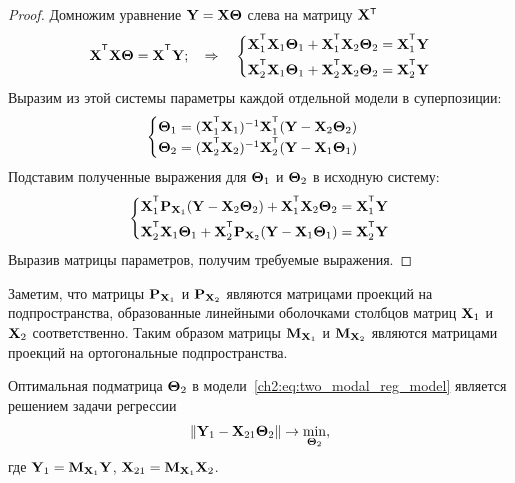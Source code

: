 \begin{proof}
	Домножим уравнение $\mathbf{Y} = \mathbf{X} \boldsymbol{\Theta}$ слева на матрицу $\bX{\T}$
	\[
		\bX^{\T} \bX \bTheta = \bX^{\T} \bY; \quad \Rightarrow \quad
		\begin{cases*}
			\bX_1^{\T} \bX_1 \bTheta_1 + \bX_1^{\T} \bX_2 \bTheta_2 = \bX_1^{\T} \bY \\
			\bX_2^{\T} \bX_1 \bTheta_1 + \bX_2^{\T} \bX_2 \bTheta_2 = \bX_2^{\T} \bY 
		\end{cases*}
	\]
	Выразим из этой системы параметры каждой отдельной модели в суперпозиции:
	\[
		\begin{cases}
			\bTheta_1 = (\bX_1^{\T} \bX_1)^{-1} \bX_1^{\T} (\bY - \bX_2 \bTheta_2) \\
			\bTheta_2 = (\bX_2^{\T} \bX_2 )^{-1}  \bX_2^{\T} (\bY - \bX_1 \bTheta_1)
		\end{cases}
	\]
	Подставим полученные выражения для $\boldsymbol{\Theta}_1$ и $\boldsymbol{\Theta}_2$ в исходную систему:
	\[
				\begin{cases*}
					\bX_1^{\T} \bP_{\bX_1} (\bY - \bX_2 \bTheta_2) + \bX_1^{\T} \bX_2 \bTheta_2 = \bX_1^{\T} \bY \\
					\bX_2^{\T} \bX_1 \bTheta_1 + \bX_2^{\T}\bP_{\bX_2} (\bY - \bX_1 \bTheta_1) = \bX_2^{\T} \bY 
				\end{cases*}
	\]
	Выразив матрицы параметров, получим требуемые выражения.
\end{proof}

Заметим, что матрицы $\mathbf{P}_{\mathbf{X}_1}$ и $\mathbf{P}_{\mathbf{X}_2}$ являются матрицами проекций на подпространства, образованные линейными оболочками столбцов матриц $\mathbf{X}_1$ и $\mathbf{X}_2$ соответственно.
Таким образом матрицы $\mathbf{M}_{\mathbf{X}_1}$ и $\mathbf{M}_{\mathbf{X}_2}$ являются матрицами проекций на ортогональные подпространства.

\begin{statement}
	\label{stat:two_modal_theta2}
	Оптимальная подматрица $\boldsymbol{\Theta}_2$ в модели~\eqref{ch2:eq:two_modal_reg_model} является решением задачи регрессии
	\begin{equation}
		\| \mathbf{Y}_1 -  \mathbf{X}_{21} \boldsymbol{\Theta}_2 \| \rightarrow \min_{\boldsymbol{\Theta}_2},
		\label{eq:two_modal_fwl}
	\end{equation}
	где $\mathbf{Y}_1 = \mathbf{M}_{\mathbf{X}_1} \mathbf{Y}$, $\mathbf{X}_{21} = \mathbf{M}_{\mathbf{X}_1} \mathbf{X}_2$.
\end{statement}

